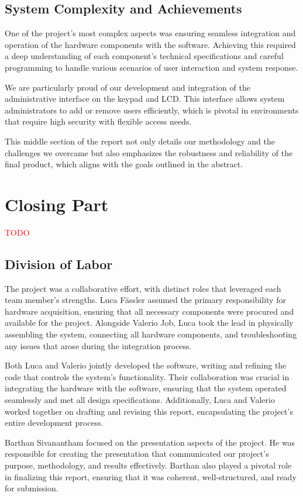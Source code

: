 \documentclass{article}
\begin{document}
\subsection{System Complexity and Achievements}
One of the project's most complex aspects was ensuring seamless integration and operation of the hardware components with the software. Achieving this required a deep understanding of each component's technical specifications and careful programming to handle various scenarios of user interaction and system response.

We are particularly proud of our development and integration of the administrative interface on the keypad and LCD. This interface allows system administrators to add or remove users efficiently, which is pivotal in environments that require high security with flexible access needs.

This middle section of the report not only details our methodology and the challenges we overcame but also emphasizes the robustness and reliability of the final product, which aligns with the goals outlined in the abstract.


\newpage
\section{Closing Part} \textcolor{red}{TODO}
\subsection{Division of Labor}
The project was a collaborative effort, with distinct roles that leveraged each team member's strengths. Luca Fässler assumed the primary responsibility for hardware acquisition, ensuring that all necessary components were procured and available for the project. Alongside Valerio Job, Luca took the lead in physically assembling the system, connecting all hardware components, and troubleshooting any issues that arose during the integration process.

Both Luca and Valerio jointly developed the software, writing and refining the code that controls the system's functionality. Their collaboration was crucial in integrating the hardware with the software, ensuring that the system operated seamlessly and met all design specifications. Additionally, Luca and Valerio worked together on drafting and revising this report, encapsulating the project's entire development process.

Barthan Sivanantham focused on the presentation aspects of the project. He was responsible for creating the presentation that communicated our project's purpose, methodology, and results effectively. Barthan also played a pivotal role in finalizing this report, ensuring that it was coherent, well-structured, and ready for submission.
\end{document}
